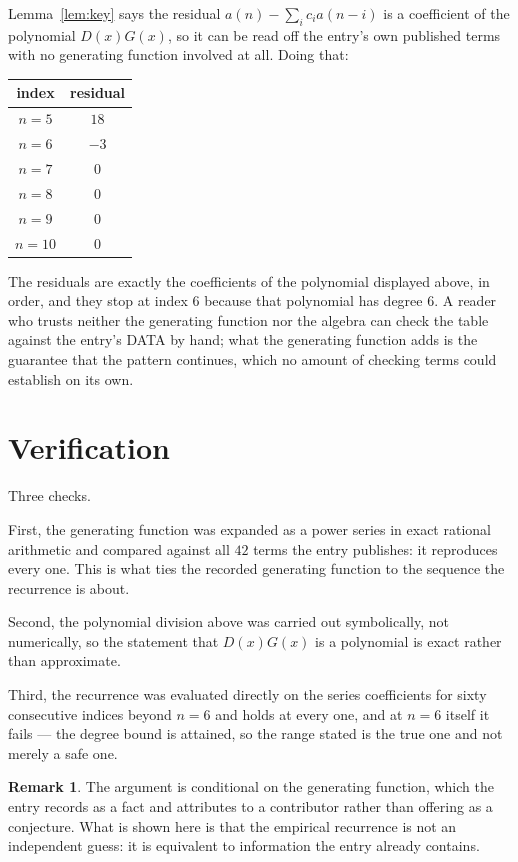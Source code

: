 \documentclass[11pt,a4paper]{article}
\theoremstyle{plain}
\theoremstyle{definition}
\newtheorem{remark}[theorem]{Remark}
\begin{document}
Lemma~\ref{lem:key} says the residual $a(n)-\sum_ic_ia(n-i)$ is a coefficient of the
polynomial $D(x)G(x)$, so it can be read off the entry's own published terms with no
generating function involved at all. Doing that:
\begin{center}
\begin{tabular}{cc}
index & residual \\ \hline
$n=5$ & $18$ \\
$n=6$ & $-3$ \\
$n=7$ & $0$ \\
$n=8$ & $0$ \\
$n=9$ & $0$ \\
$n=10$ & $0$
\end{tabular}
\end{center}
The residuals are exactly the coefficients of the polynomial displayed above, in order, and
they stop at index $6$ because that polynomial has degree $6$. A reader who trusts
neither the generating function nor the algebra can check the table against the entry's DATA
by hand; what the generating function adds is the guarantee that the pattern continues, which
no amount of checking terms could establish on its own.

\section{Verification}

Three checks.

First, the generating function was expanded as a power series in exact rational arithmetic and
compared against all $42$ terms the entry publishes: it reproduces every one. This is
what ties the recorded generating function to the sequence the recurrence is about.

Second, the polynomial division above was carried out symbolically, not numerically, so the
statement that $D(x)G(x)$ is a polynomial is exact rather than approximate.

Third, the recurrence was evaluated directly on the series coefficients for sixty consecutive
indices beyond $n=6$ and holds at every one, and at $n=6$ itself it fails --- the
degree bound is attained, so the range stated is the true one and not merely a safe one.

\begin{remark}
The argument is conditional on the generating function, which the entry records as a fact and
attributes to a contributor rather than offering as a conjecture. What is shown here is that
the empirical recurrence is not an independent guess: it is equivalent to information the
entry already contains.
\end{remark}
\end{document}
